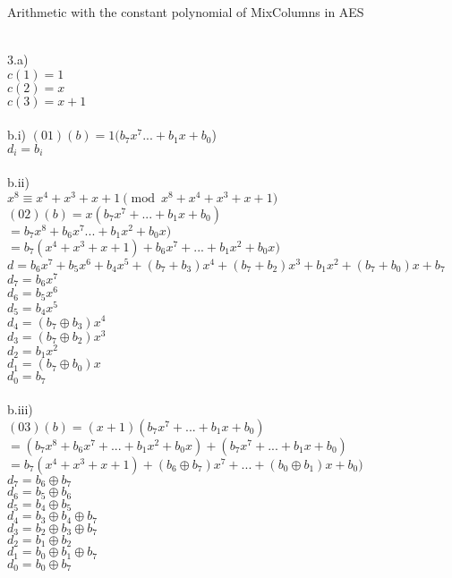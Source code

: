 \documentclass{assignment}
\begin{document}
\begin{problemlist}
\pbitem Arithmetic with the constant polynomial of MixColumns in AES
\begin{problem}
\begin{answer}
\\
3.a)\\
$c(1)=1$\\
$c(2)=x$\\
$c(3)=x+1$\\
\\
b.i)   
$(01)(b)=1(b_7x^7...+b_1x+b_0$)\\
$d_i=b_i$\\
\\
b.ii)\\
$x^8\equiv x^4+x^3+x+1 \pmod {x^8+x^4+x^3+x+1}$\\
$(02)(b)=x(b_7x^7+...+b_1x+b_0)$\\
$=b_7x^8+b_6x^7...+b_1x^2+b_0x)$\\
$=b_7(x^4+x^3+x+1)+b_6x^7+...+b_1x^2+b_0x)$\\
$d=b_6x^7+b_5x^6+b_4x^5+(b_7+b_3)x^4+(b_7+b_2)x^3+b_1x^2+(b_7+b_0)x+b_7$\\
$d_7=b_6x^7$\\
$d_6=b_5x^6$\\
$d_5=b_4x^5$\\
$d_4=(b_7\oplus b_3)x^4$\\
$d_3=(b_7\oplus b_2)x^3$\\
$d_2=b_1x^2$\\
$d_1=(b_7\oplus b_0)x$\\
$d_0=b_7$\\
\\
b.iii)\\
$(03)(b)=(x+1)(b_7x^7+...+b_1x+b_0)$\\
$=(b_7x^8+b_6x^7+...+b_1x^2+b_0x)+(b_7x^7+...+b_1x+b_0)$\\
$=b_7(x^4+x^3+x+1)+(b_6\oplus b_7)x^7+...+(b_0\oplus b_1)x+b_0)$\\
$d_7=b_6\oplus b_7$\\
$d_6=b_5\oplus b_6$\\
$d_5=b_4\oplus b_5$\\
$d_4=b_3\oplus b_4 \oplus b_7$\\
$d_3=b_2\oplus b_3 \oplus b_7$\\
$d_2=b_1\oplus b_2$\\
$d_1=b_0\oplus b_1 \oplus b_7$\\
$d_0=b_0 \oplus b_7$\\


\end{answer}
\end{problem}
\end{problemlist}
\end{document}
